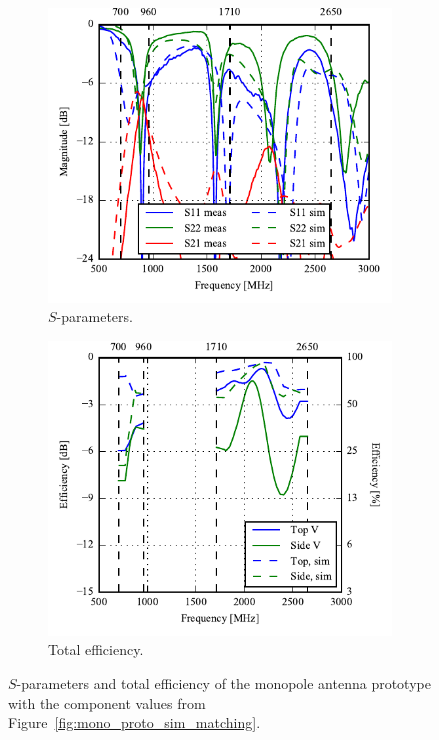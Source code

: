\begin{figure}[htbp]
    \centering
    \begin{subfigure}{0.49\linewidth}
        \includegraphics{img/tech_sol/monopole/prototype_v2/meas_sim_sparams.pdf}
        \caption{$S$-parameters.}
    \end{subfigure}
    \hfill
    \begin{subfigure}{0.49\linewidth}
        \includegraphics{img/tech_sol/monopole/prototype_v2/meas_sim_efficiency.pdf}
        \caption{Total efficiency.}
    \end{subfigure}
    \caption{$S$-parameters and total efficiency of the monopole antenna prototype with the component values from Figure~\ref{fig:mono_proto_sim_matching}.}
    \label{fig:mono_proto_sparam_eff}
\end{figure}

